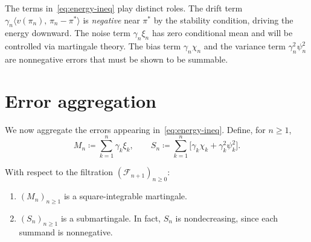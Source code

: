 \documentclass[a4paper,oneside,11pt]{report}
\newcommand{\calF}{\mathcal{F}}
\newcommand{\ip}[2]{\langle #1,\, #2 \rangle}
\numberwithin{theorem}{chapter}
\numberwithin{equation}{chapter}
\begin{document}
\begin{remark}
  \label{rem:energy-roles}
  The terms in~\eqref{eq:energy-ineq} play distinct roles.  The drift
  term $\gamma_n\ip{v(\pi_n)}{\pi_n - \pi^*}$ is \emph{negative} near
  $\pi^*$ by the stability condition, driving the energy downward.  The
  noise term $\gamma_n\xi_n$ has zero conditional mean and will be
  controlled via martingale theory.  The bias term $\gamma_n\chi_n$ and
  the variance term $\gamma_n^2\psi_n^2$ are nonnegative errors that
  must be shown to be summable.
\end{remark}

\section{Error aggregation}
\label{sec:error-agg}

We now aggregate the errors appearing in~\eqref{eq:energy-ineq}.
Define, for $n \ge 1$,
\begin{equation}
  \label{eq:M-S-def}
  M_n \coloneqq \sum_{k=1}^n \gamma_k \xi_k,
  \qquad
  S_n \coloneqq \sum_{k=1}^n
  \bigl[\gamma_k \chi_k + \gamma_k^2 \psi_k^2\bigr].
\end{equation}

\begin{lemma}
  \label{lem:mart-props}
  With respect to the filtration $(\calF_{n+1})_{n \ge 0}$:
  \begin{enumerate}[label=\textup{(\alph*)}]
  \item $(M_n)_{n \ge 1}$ is a square-integrable martingale.
  \item $(S_n)_{n \ge 1}$ is a submartingale. In fact, $S_n$ is
    nondecreasing, since each summand is nonnegative.
  \end{enumerate}
\end{lemma}
\end{document}
